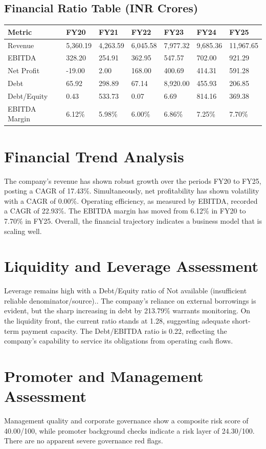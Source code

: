 \documentclass[11pt,a4paper]{article}
\begin{document}
\subsection*{Financial Ratio Table (INR Crores)}
\begin{longtable}{p{3.2cm} p{1.8cm} p{1.8cm} p{1.8cm} p{1.8cm} p{1.8cm} p{1.8cm}}
\toprule
Metric & FY20 & FY21 & FY22 & FY23 & FY24 & FY25 \\
\midrule
\endhead
Revenue & 5,360.19 & 4,263.59 & 6,045.58 & 7,977.32 & 9,685.36 & 11,967.65 \\
EBITDA & 328.20 & 254.91 & 362.95 & 547.57 & 702.00 & 921.29 \\
Net Profit & -19.00 & 2.00 & 168.00 & 400.69 & 414.31 & 591.28 \\
Debt & 65.92 & 298.89 & 67.14 & 8,920.00 & 455.93 & 206.85 \\
Debt/Equity & 0.43 & 533.73 & 0.07 & 6.69 & 814.16 & 369.38 \\
EBITDA Margin & 6.12\% & 5.98\% & 6.00\% & 6.86\% & 7.25\% & 7.70\% \\
\bottomrule
\end{longtable}

\section*{Financial Trend Analysis}
The company’s revenue has shown robust growth over the periods FY20 to FY25, posting a CAGR of 17.43\%. Simultaneously, net profitability has shown volatility with a CAGR of 0.00\%. Operating efficiency, as measured by EBITDA, recorded a CAGR of 22.93\%. The EBITDA margin has moved from 6.12\% in FY20 to 7.70\% in FY25. Overall, the financial trajectory indicates a business model that is scaling well.

\section*{Liquidity and Leverage Assessment}
Leverage remains high with a Debt/Equity ratio of Not available (insufficient reliable denominator/source).. The company's reliance on external borrowings is evident, but the sharp increasing in debt by 213.79\% warrants monitoring. On the liquidity front, the current ratio stands at 1.28, suggesting adequate short-term payment capacity. The Debt/EBITDA ratio is 0.22, reflecting the company's capability to service its obligations from operating cash flows.

\section*{Promoter and Management Assessment}
Management quality and corporate governance show a composite risk score of 40.00/100, while promoter background checks indicate a risk layer of 24.30/100. There are no apparent severe governance red flags.
\end{document}
